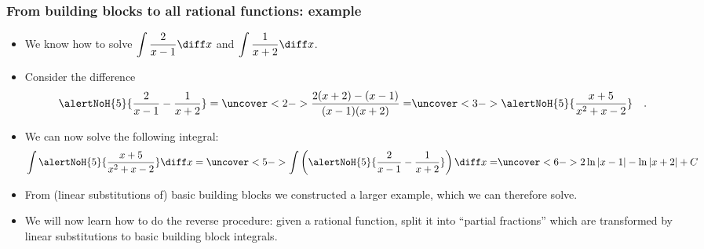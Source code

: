 \begin{frame}
\frametitle{From building blocks to all rational functions: example}
\begin{itemize}
\item We know how to solve $\displaystyle \int \frac{2}{x-1}\diff x$ and $\displaystyle \int \frac{1}{x+2}\diff x$.
\item Consider the difference
\[
\alertNoH{5}{\frac{2}{x-1} - \frac{1}{x+2} } = %
\uncover<2->{%
\frac{2(x+2) - (x-1)}{(x-1)(x+2)} = %
}%
\uncover<3->{%
\alertNoH{5}{ \frac{x + 5}{x^2+x-2} }\quad .
}%
\]
\item<4->

We can now solve the following integral:
\[
\int \alertNoH{5}{ \frac{x+5}{x^2+x-2}}\diff x = %
\uncover<5->{%
\int \left(\alertNoH{5}{\frac{2}{x-1} - \frac{1}{x+2}} \right) \diff x = %
}%
\uncover<6->{%
2\ln | x - 1| - \ln | x + 2| + C
}%
\]
\item<7-> From  (linear substitutions of) basic building blocks we constructed a larger example, which we can therefore solve.
\item<8-> We will now learn how to do the reverse procedure: given a rational function, split it into ``partial fractions'' which are transformed by linear substitutions to basic building block integrals.
\end{itemize}
\end{frame}
